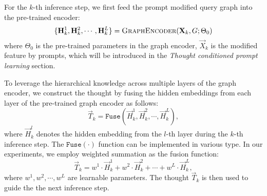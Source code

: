 For the \(k\)-th inference step, we first feed the prompt modified query graph into the pre-trained encoder:
\begin{equation}
    \{\vec{H}_k^1, \vec{H}_k^2, \cdots, \vec{H}_k^L\} = \textsc{GraphEncoder}(\vec{X}_{k},G;\Theta_0)
\end{equation}
where $\Theta_0$ is the pre-trained parameters in the graph encoder, $\vec{X}_{k}$ is the modified feature  by prompts, which will be introduced in the \textit{Thought conditioned prompt learning} section. 

To leverage the hierarchical knowledge across multiple layers of the graph encoder, we construct the thought  by fusing the hidden embeddings from each layer of the pre-trained graph encoder as follows:
\begin{equation}
    \vec{T}_{k} = \mathtt{Fuse}(\vec{H}_k^1, \vec{H}_k^2, \cdots, \vec{H}_k^L),
\end{equation}
where \(\vec{H}_k^l\) denotes the hidden embedding from the \(l\)-th layer during the \(k\)-th inference step. The $\mathtt{Fuse}(\cdot)$ function can be implemented in various type. In our experiments, we employ weighted summation as the fusion function:
\begin{equation}
    \vec{T}_{k} = w^1\cdot\vec{H}_k^1+w^2\cdot\vec{H}_k^2+\cdots+w^L\cdot\vec{H}_k^L,
\end{equation}
where $w^1,w^2,\cdots,w^L$ are learnable parameters. The thought $\vec{T}_{k}$ is then used to guide the the next inference step.

